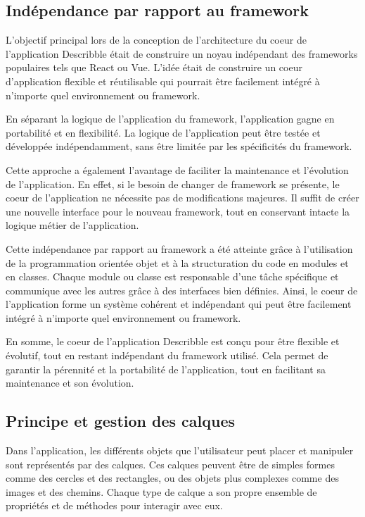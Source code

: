 \subsection{Indépendance par rapport au framework}

L'objectif principal lors de la conception de l'architecture du coeur de l'application \Gls{Describble} était de construire un noyau indépendant des frameworks populaires tels que React ou Vue. L'idée était de construire un coeur d'application flexible et réutilisable qui pourrait être facilement intégré à n'importe quel environnement ou framework.

En séparant la logique de l'application du framework, l'application gagne en portabilité et en flexibilité. La logique de l'application peut être testée et développée indépendamment, sans être limitée par les spécificités du framework.

Cette approche a également l'avantage de faciliter la maintenance et l'évolution de l'application. En effet, si le besoin de changer de framework se présente, le coeur de l'application ne nécessite pas de modifications majeures. Il suffit de créer une nouvelle interface pour le nouveau framework, tout en conservant intacte la logique métier de l'application.

Cette indépendance par rapport au framework a été atteinte grâce à l'utilisation de la programmation orientée objet et à la structuration du code en modules et en classes. Chaque module ou classe est responsable d'une tâche spécifique et communique avec les autres grâce à des interfaces bien définies. Ainsi, le coeur de l'application forme un système cohérent et indépendant qui peut être facilement intégré à n'importe quel environnement ou framework.

En somme, le coeur de l'application \Gls{Describble} est conçu pour être flexible et évolutif, tout en restant indépendant du framework utilisé. Cela permet de garantir la pérennité et la portabilité de l'application, tout en facilitant sa maintenance et son évolution.

\subsection{Principe et gestion des calques}

Dans l'application, les différents objets que l'utilisateur peut placer et manipuler sont représentés par des calques. Ces calques peuvent être de simples formes comme des cercles et des rectangles, ou des objets plus complexes comme des images et des chemins. Chaque type de calque a son propre ensemble de propriétés et de méthodes pour interagir avec eux.

